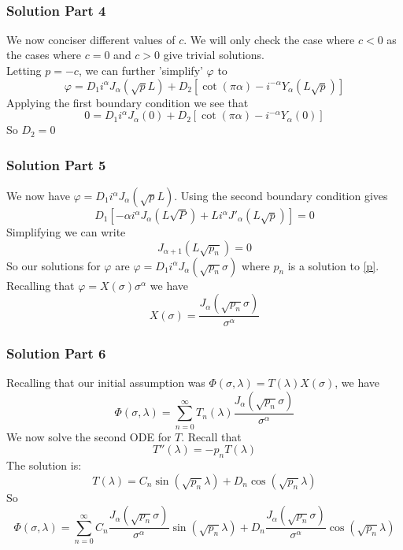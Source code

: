 \begin{frame}
\begin{tabular}{|c|c|}
		\end{tabular}\\
	\end{frame}
	
	
	
	
	
	
	
	
	
	\begin{frame}
		\frametitle{Solution Part 4}
		 We now conciser different values of $c$. We will only check the case where $c<0$ as the cases where $c=0$ and $c>0$ give trivial solutions.\\
		Letting $p=-c$, we can further 'simplify' $\varphi$ to 
		\[\varphi=D_1 i^\alpha J_\alpha(\sqrt{p}L)+D_2\left[\cot(\pi \alpha)-i^{-\alpha}Y_\alpha(L\sqrt{p})\right]\]
		Applying the first boundary condition we see that 
		\[0=D_1 i^\alpha J_\alpha(0)+D_2\left[\cot(\pi \alpha)-i^{-\alpha}Y_\alpha(0)\right]\]
		So $D_2=0$
	\end{frame}
	
	
	
		\begin{frame}
		\frametitle{Solution Part 5}
		 We now have $\varphi=D_1 i^\alpha J_\alpha(\sqrt{p}L)$. Using the second boundary condition gives
		\[
		D_1\left[-\alpha i^\alpha J_\alpha(L\sqrt{P})+Li^\alpha J'_\alpha(L\sqrt{p})\right]=0
		\]
		Simplifying we can write
		\begin{equation}
		J_{\alpha+1}(L\sqrt{p_n})=0\label{p}
		\end{equation}
		So our solutions for $\varphi$ are $\varphi=D_1i^\alpha J_\alpha(\sqrt{p_n}\sigma)$ where $p_n$ is a solution to \eqref{p}. Recalling that $\varphi=X(\sigma)\sigma ^\alpha$ we have
		\[
		X(\sigma)=\frac{J_\alpha(\sqrt{p_n}\sigma)}{\sigma^\alpha}
		\]
	\end{frame}
	
	
	
	\begin{frame}
		\frametitle{Solution Part 6}
		Recalling that our initial assumption was $\Phi(\sigma,\lambda)=T(\lambda)X(\sigma)$, we have
		\[
		\Phi(\sigma,\lambda)=\sum_{n=0}^\infty T_n(\lambda)\frac{J_\alpha(\sqrt{p_n}\sigma)}{\sigma^\alpha}
		\]
		We now solve the second ODE for $T$. Recall that
		$$T''(\lambda)=-p_nT(\lambda)$$
		The solution is:
		\[T(\lambda)=C_n \sin(\sqrt{p_n}\lambda)+D_n\cos(\sqrt{p_n}\lambda)\]
		So
		\[
		\Phi(\sigma,\lambda)=\sum_{n=0}^\infty C_n\frac{J_\alpha(\sqrt{p_n}\sigma)}{\sigma^\alpha} \sin(\sqrt{p_n}\lambda)+D_n\frac{J_\alpha(\sqrt{p_n}\sigma)}{\sigma^\alpha}\cos(\sqrt{p_n}\lambda)
		\]
	\end{frame}
	
